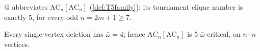 \begin{decoded}
@ abbreviates $\mathrm{AC}_n[\mathrm{AC}_n]$
(\cref{def:T5family}); its tournament clique number is exactly $5$,
for every odd $n = 2m{+}1 \ge 7$.
\end{decoded}





\label{res:omegabar_T5_del}


\label{res:card_T5}

\begin{decoded}
Every single-vertex deletion has $\bar\omega = 4$; hence
$\mathrm{AC}_n[\mathrm{AC}_n]$ is $5$-$\bar\omega$-critical, on
$n \cdot n$ vertices.
\end{decoded}


